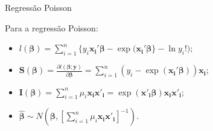 \documentclass[10pt, aspectratio=169]{beamer}
\begin{document}
\begin{frame}{Regressão Poisson} 

Para a regressão Poisson:

\vspace{0.5cm}

\begin{itemize} 

\item $l(\boldsymbol{\beta})=\sum_{i=1}^{n} \{ y_{i}\boldsymbol{x_{i}'\beta}-\exp{(\boldsymbol{x_{i}'\beta}}\}-\ln{y_{i}!});$

\vspace{0.5cm}

\item $\boldsymbol{S}(\boldsymbol{\beta})=\frac{\partial l(\boldsymbol{\beta};\boldsymbol{y})}{\partial \boldsymbol{\beta}}=
              \sum_{i=1}^{n}(y_{i}-\exp(\boldsymbol{x_{i}'\beta}))\boldsymbol{x_{i}};$       
\vspace{0.5cm}
  
\item $
\boldsymbol{I({\beta})} = \sum_{i=1}^n \mu_i \boldsymbol{x_i x'_i}  = \exp{(\boldsymbol{x'_i \beta})\boldsymbol{x_i x'_i}}; 
$
  
\vspace{0.5cm}
  
\item  $
\boldsymbol{\hat{\beta}} \sim N \left ( \boldsymbol{\beta}, \left [ \sum_{i=1}^n \mu_i \boldsymbol{x_i x'_i} \right ]^{-1} \right ). 
$ 
       
\end{itemize}

\end{frame}




\end{document}
